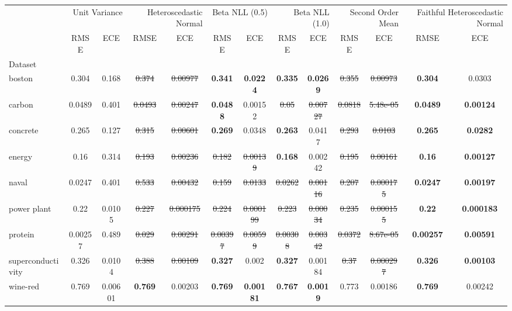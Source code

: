 \begin{tabular}{l|cc|cc|cc|cc|cc|cc}
\toprule
{} & \multicolumn{2}{r}{Unit Variance} & \multicolumn{2}{r}{Heteroscedastic Normal} & \multicolumn{2}{r}{Beta NLL (0.5)} & \multicolumn{2}{r}{Beta NLL (1.0)} & \multicolumn{2}{r}{Second Order Mean} & \multicolumn{2}{r}{Faithful Heteroscedastic Normal} \\
{} & {RMSE} & {ECE} & {RMSE} & {ECE} & {RMSE} & {ECE} & {RMSE} & {ECE} & {RMSE} & {ECE} & {RMSE} & {ECE} \\
{Dataset} & {} & {} & {} & {} & {} & {} & {} & {} & {} & {} & {} & {} \\
\midrule
boston & 0.304 & 0.168 & \sout{0.374} & \sout{0.00977} & \textbf{0.341} & \textbf{0.0224} & \textbf{0.335} & \textbf{0.0269} & \sout{0.355} & \sout{0.00973} & \textbf{0.304} & 0.0303 \\
carbon & 0.0489 & 0.401 & \sout{0.0493} & \sout{0.00247} & \textbf{0.0488} & 0.00152 & \sout{0.05} & \sout{0.00727} & \sout{0.0818} & \sout{5.48e-05} & \textbf{0.0489} & \textbf{0.00124} \\
concrete & 0.265 & 0.127 & \sout{0.315} & \sout{0.00601} & \textbf{0.269} & 0.0348 & \textbf{0.263} & 0.0417 & \sout{0.293} & \sout{0.0103} & \textbf{0.265} & \textbf{0.0282} \\
energy & 0.16 & 0.314 & \sout{0.193} & \sout{0.00236} & \sout{0.182} & \sout{0.00139} & \textbf{0.168} & 0.00242 & \sout{0.195} & \sout{0.00161} & \textbf{0.16} & \textbf{0.00127} \\
naval & 0.0247 & 0.401 & \sout{0.533} & \sout{0.00432} & \sout{0.159} & \sout{0.0133} & \sout{0.0262} & \sout{0.00116} & \sout{0.207} & \sout{0.000175} & \textbf{0.0247} & \textbf{0.00197} \\
power plant & 0.22 & 0.0105 & \sout{0.227} & \sout{0.000175} & \sout{0.224} & \sout{0.000199} & \sout{0.223} & \sout{0.00034} & \sout{0.235} & \sout{0.000155} & \textbf{0.22} & \textbf{0.000183} \\
protein & 0.00257 & 0.489 & \sout{0.029} & \sout{0.00291} & \sout{0.00397} & \sout{0.00599} & \sout{0.00308} & \sout{0.00342} & \sout{0.0372} & \sout{8.67e-05} & \textbf{0.00257} & \textbf{0.00591} \\
superconductivity & 0.326 & 0.0104 & \sout{0.388} & \sout{0.00109} & \textbf{0.327} & 0.002 & \textbf{0.327} & 0.00184 & \sout{0.37} & \sout{0.000297} & \textbf{0.326} & \textbf{0.00103} \\
wine-red & 0.769 & 0.00601 & \textbf{0.769} & 0.00203 & \textbf{0.769} & \textbf{0.00181} & \textbf{0.767} & \textbf{0.0019} & 0.773 & 0.00186 & \textbf{0.769} & 0.00242 \\

\end{tabular}

